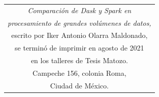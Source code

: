 \documentclass[11pt, oneside]{book}
\begin{document}
\begin{thebibliography}{111}























\end{thebibliography}

\newpage
\thispagestyle{empty}
\begin{table}[p]
\centering
\small
\label{ed}
\begin{tabular}{c}
\textit{Comparación de Dask y Spark en} \\ \textit{procesamiento de grandes volúmenes de datos,}\\ escrito por Iker Antonio Olarra Maldonado,\\ se terminó de imprimir en agosto de 2021\\ en los talleres de Tesis Matozo.\\ Campeche 156, colonia Roma,\\ Ciudad de México.
\end{tabular}
\end{table}


\end{document}
